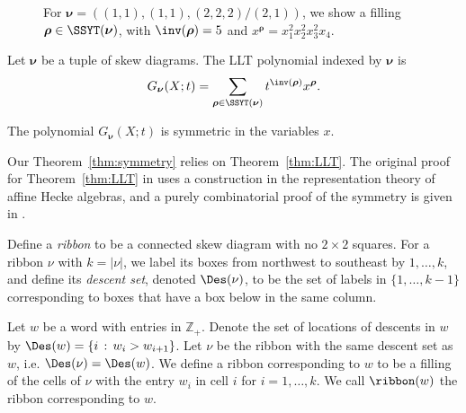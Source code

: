 \begin{figure}[h]
\centering
{}
\caption{For $\boldsymbol{\nu}=((1,1),(1,1),(2,2,2)/(2,1))$, we show a filling $\boldsymbol{\rho}\in\SSYT(\boldsymbol{\nu})$, with $\inv(\boldsymbol{\rho})=5$ and $x^{\boldsymbol{\rho}}=x_1^2x_2^2x_3^2x_4$.}
\label{fig:LLT1}
\end{figure}


\begin{defn}\label{def:LLT}
Let $\boldsymbol{\nu}$ be a tuple of skew diagrams. The LLT polynomial indexed by $\boldsymbol{\nu}$ is
\[
G_{\boldsymbol{\nu}}(X;t) = \sum_{\boldsymbol{\rho}\in\SSYT(\boldsymbol{\nu})} t^{\inv(\boldsymbol{\rho})}x^{\boldsymbol{\rho}}.
\]

\end{defn}
\begin{theorem}\label{thm:LLT} 
The polynomial $G_{\boldsymbol{\nu}}(X;t)$ is symmetric in the variables $x$.
\end{theorem}
\begin{remark} Our Theorem~\ref{thm:symmetry} relies on Theorem~\ref{thm:LLT}. The original proof for Theorem~\ref{thm:LLT} in \cite{LLT} uses a construction in the representation theory of affine Hecke algebras, and a purely combinatorial proof of the symmetry is given in \cite[Section 10: Appendix]{HHL05}.
\end{remark}

\begin{defn}\label{def:ribbon}
Define a \emph{ribbon} to be a connected skew diagram with no $2\times2$ squares. For a ribbon $\nu$ with $k=|\nu|$, we label its boxes from northwest to southeast by $1,\ldots,k$, and define its
{\em descent set}, denoted $\Des(\nu)$, to be the set of labels in $\{1,\ldots,k-1\}$ corresponding to boxes that have a box below in the same column.

Let $w$ be a word with entries in $\mathbb{Z}_+$. Denote the set of locations of descents in $w$ by $\Des(w) = \{i\,:\,w_i>w_{i+1}\}$. Let $\nu$ be the ribbon with the same descent set as $w$, i.e. $\Des(\nu)=\Des(w)$. We define a ribbon corresponding to $w$ to be a filling of the cells of $\nu$ with the entry $w_i$ in cell $i$ for $i=1,\ldots,k$. We call $\ribbon(w)$ the ribbon corresponding to $w$. 
\end{defn}

